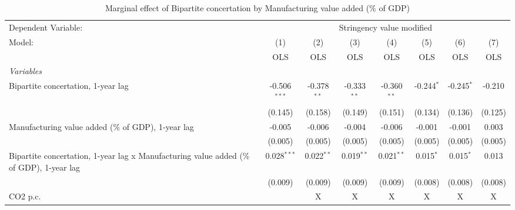 
\begin{table}[htbp]
   \caption{Marginal effect of Bipartite concertation by Manufacturing value added (\% of GDP)}
   \centering
   \begin{tabular}{lccccccc}
      \toprule
      Dependent Variable: & \multicolumn{7}{c}{Stringency value modified}\\
      Model:                                                                                  & (1)            & (2)           & (3)           & (4)           & (5)          & (6)          & (7)\\  
                                                                                              &  OLS           & OLS           & OLS           & OLS           & OLS          & OLS          & OLS\\  
      \midrule
      \emph{Variables}\\
      Bipartite concertation, 1-year lag                                                      & -0.506$^{***}$ & -0.378$^{**}$ & -0.333$^{**}$ & -0.360$^{**}$ & -0.244$^{*}$ & -0.245$^{*}$ & -0.210\\   
                                                                                              & (0.145)        & (0.158)       & (0.149)       & (0.151)       & (0.134)      & (0.136)      & (0.125)\\   
      Manufacturing value added (\% of GDP), 1-year lag                                       & -0.005         & -0.006        & -0.004        & -0.006        & -0.001       & -0.001       & 0.003\\   
                                                                                              & (0.005)        & (0.005)       & (0.005)       & (0.005)       & (0.005)      & (0.005)      & (0.005)\\   
      Bipartite concertation, 1-year lag x Manufacturing value added (\% of GDP), 1-year lag  & 0.028$^{***}$  & 0.022$^{**}$  & 0.019$^{**}$  & 0.021$^{**}$  & 0.015$^{*}$  & 0.015$^{*}$  & 0.013\\   
                                                                                              & (0.009)        & (0.009)       & (0.009)       & (0.009)       & (0.008)      & (0.008)      & (0.008)\\   
      CO2 p.c.                                                                                &                & X             & X             & X             & X            & X            & X\\  

\end{tabular}
\end{table}

